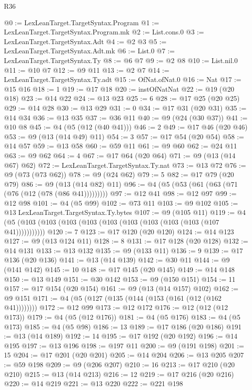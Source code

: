 \begin{lexlean}{R36}
\begin{coremodule}
{{{{{{{{{{{{{{{{{{{{{{{{{{{{{{{{{{{{{{{{{{{{{{{{{{{{{{{{{{{{{{{{{{{{{{{{{{{{{{{{{{@0 := LexLeanTarget.TargetSyntax.Program
@1 := LexLeanTarget.TargetSyntax.Program.mk
@2 := List.cons.{0}
@3 := LexLeanTarget.TargetSyntax.Adt
@4 := @2 @3
@5 := LexLeanTarget.TargetSyntax.Adt.mk
@6 := List.{0}
@7 := LexLeanTarget.TargetSyntax.Ty
@8 := @6 @7
@9 := @2 @8
@10 := List.nil.{0}
@11 := @10 @7
@12 := @9 @11
@13 := @2 @7
@14 := LexLeanTarget.TargetSyntax.Ty.adt
@15 := OfNat.ofNat.{0}
@16 := Nat
@17 := @15 @16
@18 := 1
@19 := @17 @18
@20 := instOfNatNat
@22 := @19 (@20 @18)
@23 := @14 @22
@24 := @13 @23
@25 := 6
@28 := @17 @25 (@20 @25)
@29 := @14 @28
@30 := @13 @29
@31 := 0
@34 := @17 @31 (@20 @31)
@35 := @14 @34
@36 := @13 @35
@37 := @36 @11
@40 := @9 (@24 (@30 @37))
@41 := @10 @8
@45 := @4 (@5 (@12 (@40 @41)))
@46 := 2
@49 := @17 @46 (@20 @46)
@53 := @9 (@13 (@14 @49) @11)
@54 := 3
@57 := @17 @54 (@20 @54)
@58 := @14 @57
@59 := @13 @58
@60 := @59 @11
@61 := @9 @60
@62 := @24 @11
@63 := @9 @62
@64 := 4
@67 := @17 @64 (@20 @64)
@71 := @9 (@13 (@14 @67) @62)
@72 := LexLeanTarget.TargetSyntax.Ty.nat
@73 := @13 @72
@76 := @9 (@73 (@73 @62))
@78 := @9 (@24 @62)
@79 := 5
@82 := @17 @79 (@20 @79)
@86 := @9 (@13 (@14 @82) @11)
@96 := @4 (@5 (@53 (@61 (@63 (@71 (@76 (@12 (@78 (@86 @41)))))))))
@97 := @12 @41
@98 := @12 @97
@99 := @12 @98
@101 := @4 (@5 @99)
@102 := @73 @11
@103 := @9 @102
@105 := @13 LexLeanTarget.TargetSyntax.Ty.bytes
@107 := @9 (@105 @11)
@119 := @4 (@5 (@103 (@103 (@103 (@103 (@103 (@103 (@103 (@103 (@103 (@107 @41)))))))))))
@120 := 7
@123 := @17 @120 (@20 @120)
@124 := @14 @123
@127 := @9 (@13 @124 @11)
@128 := 8
@131 := @17 @128 (@20 @128)
@132 := @14 @131
@133 := @13 @132
@135 := @9 (@133 @11)
@136 := 9
@139 := @17 @136 (@20 @136)
@141 := @13 (@14 @139)
@142 := @30 @11
@144 := @9 (@141 @142)
@145 := 10
@148 := @17 @145 (@20 @145)
@149 := @14 @148
@150 := @13 @149
@151 := @30 @142
@153 := @9 (@150 @151)
@154 := 11
@157 := @17 @154 (@20 @154)
@161 := @9 (@13 (@14 @157) @102)
@162 := @9 @151
@171 := @4 (@5 (@127 (@135 (@144 (@153 (@161 (@12 (@162 @41))))))))
@172 := @12 @99
@173 := @12 @172
@176 := @12 (@12 (@12 @173))
@179 := @4 (@5 (@12 @176))
@181 := @4 (@5 @176)
@183 := @4 (@5 @173)
@185 := @4 (@5 @98)
@186 := 13
@189 := @17 @186 (@20 @186)
@191 := @13 (@14 @189)
@192 := 14
@195 := @17 @192 (@20 @192)
@196 := @14 @195
@197 := @13 @196
@198 := @197 @11
@200 := @9 (@191 @198)
@201 := 15
@204 := @17 @201 (@20 @201)
@205 := @14 @204
@206 := @13 @205
@207 := @59 @198
@209 := @9 (@206 @207)
@210 := 16
@213 := @17 @210 (@20 @210)
@215 := @13 (@14 @213)
@216 := 12
@219 := @17 @216 (@20 @216)
@220 := @14 @219
@221 := @13 @220
@222 := @221 @198
}}}}}}}}}}}}}}}}}}}}}}}}}}}}}}}}}}}}}}}}}}}}}}}}}}}}}}}}}}}}}}}}}}}}}}}}}}}}}}}}}}
\end{coremodule}
\end{lexlean}
